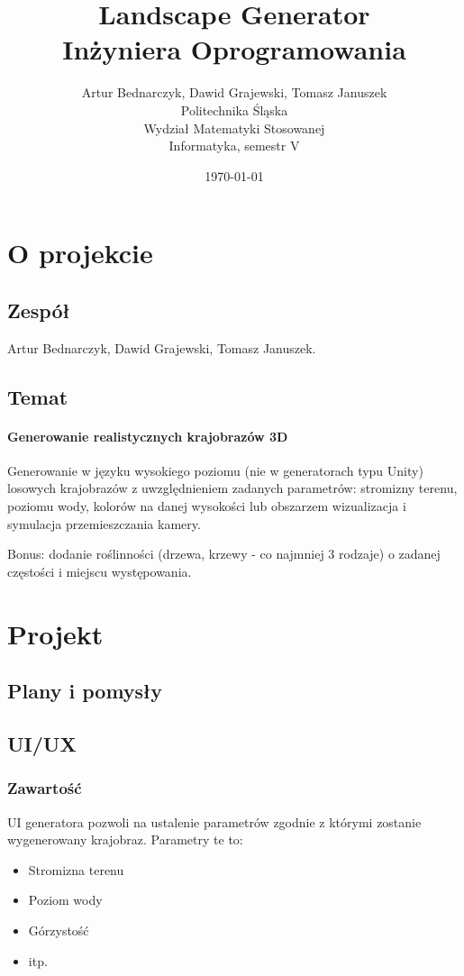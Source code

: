 \documentclass[12pt,a4paper]{article}
\title{Landscape Generator\\Inżyniera Oprogramowania}
\author{Artur Bednarczyk, Dawid Grajewski, Tomasz Januszek\\Politechnika Śląska\\Wydział Matematyki Stosowanej\\Informatyka, semestr V}
\date{\today}
\begin{document}
\maketitle
\newpage
\tableofcontents
\newpage
\section{O projekcie}
\subsection{Zespół}
Artur Bednarczyk, Dawid Grajewski, Tomasz Januszek.
\subsection{Temat}
\paragraph{Generowanie realistycznych krajobrazów 3D}
Generowanie w języku wysokiego poziomu (nie w generatorach typu Unity) losowych krajobrazów z uwzględnieniem zadanych parametrów: stromizny terenu, poziomu wody, kolorów na danej wysokości lub obszarzem wizualizacja i symulacja przemieszczania kamery.

Bonus: dodanie roślinności (drzewa, krzewy - co najmniej 3 rodzaje) o zadanej częstości i miejscu występowania.

\section{Projekt}
\subsection{Plany i pomysły}

\subsection{UI/UX}
\subsubsection{Zawartość}
UI generatora pozwoli na ustalenie parametrów zgodnie z którymi zostanie wygenerowany krajobraz. Parametry te to: \begin{itemize}
\item Stromizna terenu
\item Poziom wody
\item Górzystość
\item itp.
\end{itemize}
\end{document}
